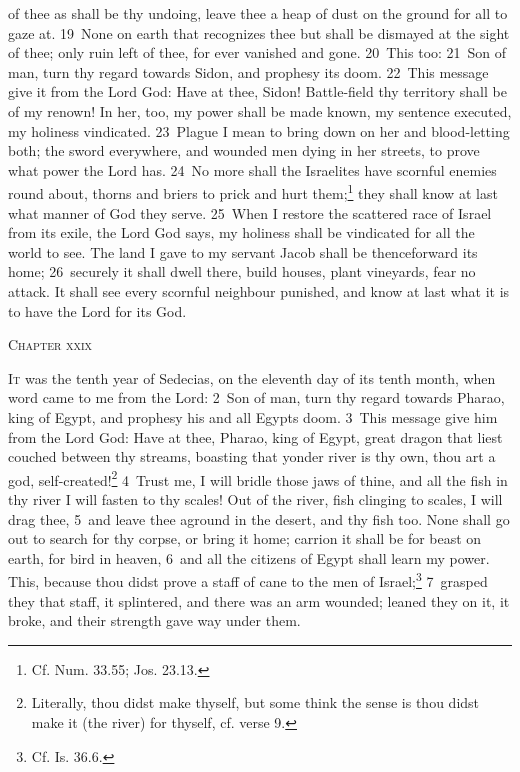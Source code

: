 \documentclass[10pt]{book} %
\begin{document}
of thee as shall be thy undoing, leave thee a heap of dust on the ground for all to gaze at. \textcolor{benred8}{19}~None on earth that recognizes thee but shall be dismayed at the sight of thee; only ruin left of thee, for ever vanished and gone.
\textcolor{benred8}{20}~This too: \textcolor{benred8}{21}~Son of man, turn thy regard towards Sidon, and prophesy its doom. \textcolor{benred8}{22}~This message give it from the Lord God: Have at thee, Sidon! Battle-field thy territory shall be of my renown! In her, too, my power shall be made known, my sentence executed, my holiness vindicated. \textcolor{benred8}{23}~Plague I mean to bring down on her and blood-letting both; the sword everywhere, and wounded men dying in her streets, to prove what power the Lord has.
\textcolor{benred8}{24}~No more shall the Israelites have scornful enemies round about, thorns and briers to prick and hurt them;\footnote[5]{Cf. Num. 33.55; Jos. 23.13.} they shall know at last what manner of God they serve. \textcolor{benred8}{25}~When I restore the scattered race of Israel from its exile, the Lord God says, my holiness shall be vindicated for all the world to see. The land I gave to my servant Jacob shall be thenceforward its home; \textcolor{benred8}{26}~securely it shall dwell there, build houses, plant vineyards, fear no attack. It shall see every scornful neighbour punished, and know at last what it is to have the Lord for its God.
\begin{large}\begin{center}\textsc{Chapter xxix}\end{center}\end{large}
\lettrine[lines=2]{I}{t} was the tenth year of Sedecias, on the eleventh day of its tenth month, when word came to me from the Lord: \textcolor{benred8}{2}~Son of man, turn thy regard towards Pharao, king of Egypt, and prophesy his and all Egypt\textquotesingle s doom. \textcolor{benred8}{3}~This message give him from the Lord God: Have at thee, Pharao, king of Egypt, great dragon that liest couched between thy streams, boasting that yonder river is thy own, thou art a god, self-created!\footnote[1]{Literally, \textasciigrave thou didst make thyself\textquotesingle , but some think the sense is \textasciigrave thou didst make it (the river) for thyself\textquotesingle , cf. verse 9.} \textcolor{benred8}{4}~Trust me, I will bridle those jaws of thine, and all the fish in thy river I will fasten to thy scales! Out of the river, fish clinging to scales, I will drag thee, \textcolor{benred8}{5}~and leave thee aground in the desert, and thy fish too. None shall go out to search for thy corpse, or bring it home; carrion it shall be for beast on earth, for bird in heaven, \textcolor{benred8}{6}~and all the citizens of Egypt shall learn my power. This, because thou didst prove a staff of cane to the men of Israel;\footnote[2]{Cf. Is. 36.6.} \textcolor{benred8}{7}~grasped they that staff, it splintered, and there was an arm wounded; leaned they on it, it broke, and their strength gave way under them.
\end{document}
